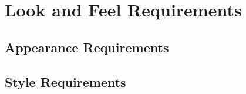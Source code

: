 \chapter{Look and Feel Requirements}

\section{Appearance Requirements}

\section{Style Requirements}
